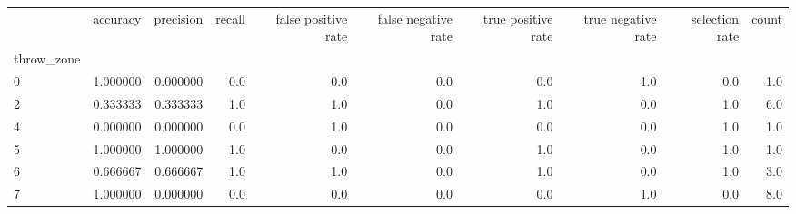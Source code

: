 \begin{tabular}{lrrrrrrrrr}
\toprule
{} &  accuracy &  precision &  recall &  false positive rate &  false negative rate &  true positive rate &  true negative rate &  selection rate &  count \\
throw\_zone &           &            &         &                      &                      &                     &                     &                 &        \\
\midrule
0          &  1.000000 &   0.000000 &     0.0 &                  0.0 &                  0.0 &                 0.0 &                 1.0 &             0.0 &    1.0 \\
2          &  0.333333 &   0.333333 &     1.0 &                  1.0 &                  0.0 &                 1.0 &                 0.0 &             1.0 &    6.0 \\
4          &  0.000000 &   0.000000 &     0.0 &                  1.0 &                  0.0 &                 0.0 &                 0.0 &             1.0 &    1.0 \\
5          &  1.000000 &   1.000000 &     1.0 &                  0.0 &                  0.0 &                 1.0 &                 0.0 &             1.0 &    1.0 \\
6          &  0.666667 &   0.666667 &     1.0 &                  1.0 &                  0.0 &                 1.0 &                 0.0 &             1.0 &    3.0 \\
7          &  1.000000 &   0.000000 &     0.0 &                  0.0 &                  0.0 &                 0.0 &                 1.0 &             0.0 &    8.0 \\
\bottomrule
\end{tabular}
